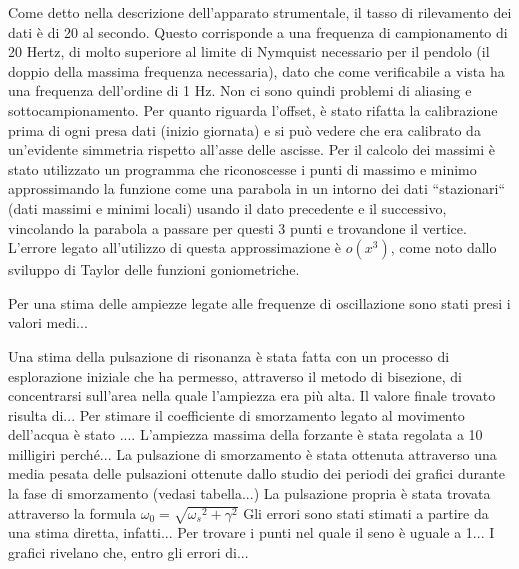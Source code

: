Come detto nella descrizione dell'apparato strumentale, il tasso di rilevamento dei dati è di 20 al secondo. Questo corrisponde a una
frequenza di campionamento di 20 Hertz, di molto superiore al 
limite di Nymquist necessario per il pendolo (il doppio della massima frequenza
necessaria), dato che come verificabile a vista ha una frequenza dell'ordine di 1 Hz. 
Non ci sono quindi problemi di aliasing e sottocampionamento.
Per quanto riguarda l'offset, è stato rifatta la calibrazione prima di ogni presa dati (inizio giornata) e si può vedere che era
 calibrato da un'evidente simmetria rispetto all'asse delle ascisse.
Per il calcolo dei massimi è stato utilizzato un programma che riconoscesse i punti di massimo e minimo approssimando
la funzione come una parabola in un intorno dei dati ``stazionari`` (dati massimi e minimi locali) usando il dato precedente e il successivo,
vincolando la parabola a passare per questi 3 punti e trovandone il vertice. L'errore legato all'utilizzo
 di questa approssimazione è $o(x^3)$, come noto dallo sviluppo di Taylor delle funzioni goniometriche.

Per una stima delle ampiezze legate alle frequenze di oscillazione sono stati presi i valori medi...

Una stima della pulsazione di risonanza è stata fatta con un processo di esplorazione iniziale che ha permesso, attraverso
il metodo di bisezione, di concentrarsi sull'area nella quale l'ampiezza era più alta. Il valore finale trovato risulta di...
Per stimare il coefficiente di smorzamento legato al movimento dell'acqua è stato ....
L'ampiezza massima della forzante è stata regolata a 10 milligiri perché...
La pulsazione di smorzamento è stata ottenuta attraverso una media pesata delle pulsazioni ottenute dallo studio dei periodi dei
grafici durante la fase di smorzamento (vedasi tabella...)
La pulsazione propria è stata trovata attraverso la formula $\omega_0 =\sqrt{{\omega_s} ^ 2 + \gamma ^ 2 }$
Gli errori sono stati stimati a partire da una stima diretta, infatti...
Per trovare i punti nel quale il seno è uguale a 1...
I grafici rivelano che, entro gli errori di...
